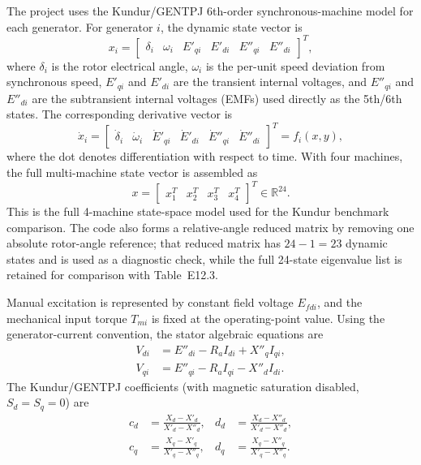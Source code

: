 \documentclass[12pt,a4paper]{article}
\begin{document}
The project uses the Kundur/GENTPJ 6th-order synchronous-machine model for
each generator. For generator $i$, the dynamic state vector is
\begin{equation}
x_i =
\begin{bmatrix}
\delta_i & \omega_i & E'_{q i} & E'_{d i} &
E''_{q i} & E''_{d i}
\end{bmatrix}^{T},
\end{equation}
where $\delta_i$ is the rotor electrical angle, $\omega_i$ is the per-unit
speed deviation from synchronous speed, $E'_{q i}$ and $E'_{d i}$ are the
transient internal voltages, and $E''_{q i}$ and $E''_{d i}$ are the
subtransient internal voltages (EMFs) used directly as the 5th/6th states.
The corresponding derivative vector is
\begin{equation}
\dot{x}_i =
\begin{bmatrix}
\dot{\delta}_i & \dot{\omega}_i & \dot{E}'_{q i} & \dot{E}'_{d i} &
\dot{E}''_{q i} & \dot{E}''_{d i}
\end{bmatrix}^{T}
= f_i(x,y),
\end{equation}
where the dot denotes differentiation with respect to time. With four
machines, the full multi-machine state vector is assembled as
\begin{equation}
x =
\begin{bmatrix}
x_1^{T} & x_2^{T} & x_3^{T} & x_4^{T}
\end{bmatrix}^{T}
\in \mathbb{R}^{24}.
\end{equation}
This is the full 4-machine state-space model used for the Kundur benchmark
comparison. The code also forms a relative-angle reduced matrix by removing one
absolute rotor-angle reference; that reduced matrix has $24-1=23$ dynamic
states and is used as a diagnostic check, while the full 24-state eigenvalue
list is retained for comparison with Table~E12.3.

Manual excitation is represented by constant field voltage $E_{fd i}$, and
the mechanical input torque $T_{m i}$ is fixed at the operating-point value.
Using the generator-current convention, the stator algebraic equations are
\begin{align}
V_{d i} &= E''_{d i} - R_a I_{d i} + X''_q I_{q i},\\
V_{q i} &= E''_{q i} - R_a I_{q i} - X''_d I_{d i}.
\end{align}
The Kundur/GENTPJ coefficients (with magnetic saturation disabled,
$S_d = S_q = 0$) are
\begin{align}
c_d &= \frac{X_d - X'_d}{X'_d - X''_d}, &
d_d &= \frac{X_d - X''_d}{X'_d - X''_d},\\
c_q &= \frac{X_q - X'_q}{X'_q - X''_q}, &
d_q &= \frac{X_q - X''_q}{X'_q - X''_q}.
\end{align}
\end{document}
